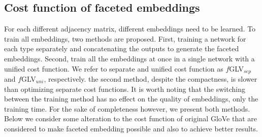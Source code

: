 \subsection{Cost function of faceted embeddings}
\label{sec:faceted_embeddings}
For each different adjacency matrix, different embeddings need to be learned. To train all embeddings, two methods are proposed. First, training a network for each type separately and concatenating the outputs to generate the faceted embeddings. Second, train all the embeddings at once in a single network with a unified cost function. We refer to separate and unified cost function as $f$GLV$_{sep}$ and $f$GLV$_{uni}$, respectively.  the second method, despite the compactness, is slower than optimizing separate cost functions. It is worth noting that the switching between the training method has no effect on the quality of embeddings, only the training time. For the sake of completeness however, we present both methods. Below we consider some alteration to the cost function of original GloVe that are considered to make faceted embedding possible and also to achieve better results. 
